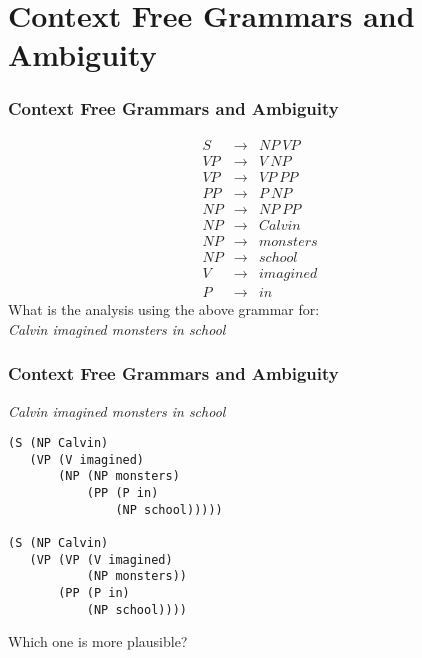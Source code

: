 
\ifx\pdfoutput\undefined
  \usepackage{graphicx}
\else
\fi



\section{Context Free Grammars and Ambiguity}

\begin{frame}[fragile]
\frametitle{Context Free Grammars and Ambiguity}
\[
\begin{array}{ccc}
 S & \rightarrow & NP~VP  \\
 VP & \rightarrow & V~NP   \\
 VP & \rightarrow & VP~PP \\
 PP & \rightarrow & P~NP   \\
 NP & \rightarrow & NP~PP  \\
 NP & \rightarrow & Calvin  \\
 NP & \rightarrow & monsters  \\
 NP & \rightarrow & school  \\
 V & \rightarrow & imagined \\
 P & \rightarrow & in     
\end{array}
\]
What is the analysis using the above grammar for:\\
{\em Calvin imagined monsters in school}
\end{frame}

\begin{frame}[fragile]
\frametitle{Context Free Grammars and Ambiguity}
{\em Calvin imagined monsters in school}
\begin{verbatim}
(S (NP Calvin)
   (VP (V imagined)
       (NP (NP monsters)
           (PP (P in)
               (NP school)))))

(S (NP Calvin)
   (VP (VP (V imagined)
           (NP monsters))
       (PP (P in)
           (NP school))))
\end{verbatim}
Which one is more plausible?
\end{frame}

